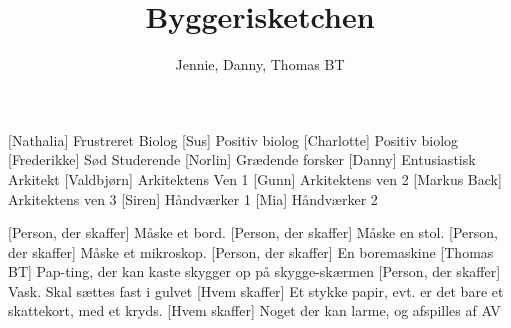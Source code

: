 \documentclass[a4paper,11pt]{article}
\title{Byggerisketchen}
\author{Jennie, Danny, Thomas BT}
\begin{document}
\maketitle

\begin{roles}
    [Nathalia] Frustreret Biolog
    [Sus] Positiv biolog
    [Charlotte] Positiv biolog
    [Frederikke] Sød Studerende
    [Norlin] Grædende forsker
    [Danny] Entusiastisk Arkitekt
    [Valdbjørn] Arkitektens Ven 1
[Gunn] Arkitektens ven 2
[Markus Back] Arkitektens ven 3
    [Siren] Håndværker 1
    [Mia] Håndværker 2
\end{roles}

\begin{props}
    [Person, der skaffer] Måske et bord.
    [Person, der skaffer] Måske en stol.
    [Person, der skaffer] Måske et mikroskop.
    [Person, der skaffer] En boremaskine
    [Thomas BT] Pap-ting, der kan kaste skygger op på skygge-skærmen
    [Person, der skaffer] Vask. Skal sættes fast i gulvet
    [Hvem skaffer] Et stykke papir, evt. er det bare et skattekort, med et kryds. 
     [Hvem skaffer] Noget der kan larme, og afspilles af AV
\end{props}
\end{document}
